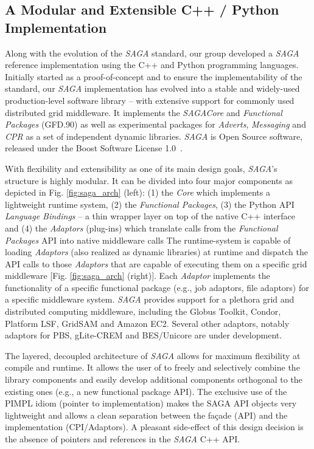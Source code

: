 \documentclass[a4paper,10pt]{article}
\newcommand{\I}[1]{\textit{#1}}
\newcommand{\sagaspec}{\textit{SAGA}\xspace}
\newcommand{\sagaimpl}{\textit{SAGA}\xspace}
\newcommand{\spec}{\sagaspec}
\newcommand{\impl}{\sagaimpl}
\begin{document}
\vspace{-0.8em}


\subsection*{A Modular and Extensible C++ / Python Implementation}
\vspace{-0.5em}

Along with the evolution of the \spec standard, our group developed a \impl reference implementation using the C++ and Python programming languages. Initially started as a proof-of-concept and to ensure the implementability of the standard, our \impl implementation has evolved into a stable and widely-used production-level software library -- with extensive support for commonly used distributed grid middleware. It implements the \spec \textit{Core} and \textit{Functional Packages} (GFD.90) as well as experimental packages for \textit{Adverts}, \textit{Messaging} and \textit{CPR} as a set of independent dynamic libraries. \impl is Open Source software, released under the Boost Software License 1.0~\cite{boost_license_web}. 

With flexibility and extensibility as one of its main design goals, \impl's structure is highly modular. It can be divided into four major components as depicted in Fig. \ref{fig:saga_arch} (left): (1) the \I{Core} which implements a lightweight runtime system, (2) the \I{Functional Packages}, (3) the Python API \I{Language Bindings} -- a thin wrapper layer on top of the native C++ interface and (4) the \I{Adaptors} (plug-ins) which translate calls from the \I{Functional Packages} API into native middleware calls The runtime-system is capable of loading \I{Adaptors} (also realized as dynamic libraries) at runtime and dispatch the API calls to those \I{Adaptors} that are capable of executing them on a specific grid middleware [Fig. \ref{fig:saga_arch} (right)]. Each \I{Adaptor} implements the functionality of a specific functional package (e.g., job adaptors, file adaptors) for a specific middleware system. \impl provides support for a plethora grid and distributed computing middleware, including the Globus Toolkit, Condor, Platform LSF, GridSAM and Amazon EC2. Several other adaptors, notably adaptors for PBS, gLite-CREM and BES/Unicore are under development. 

The layered, decoupled architecture of \impl allows for maximum flexibility at compile and runtime. It allows the user of to freely and selectively combine the library components and easily develop additional components orthogonal to the existing ones (e.g., a new functional package API). The exclusive use of the PIMPL idiom (pointer to implementation) makes the SAGA API objects very lightweight and allows a clean separation between the fa\c{c}ade (API) and the implementation (CPI/Adaptors). A pleasant side-effect of this design decision is the absence of pointers and references in the \impl C++ API.
\end{document}
